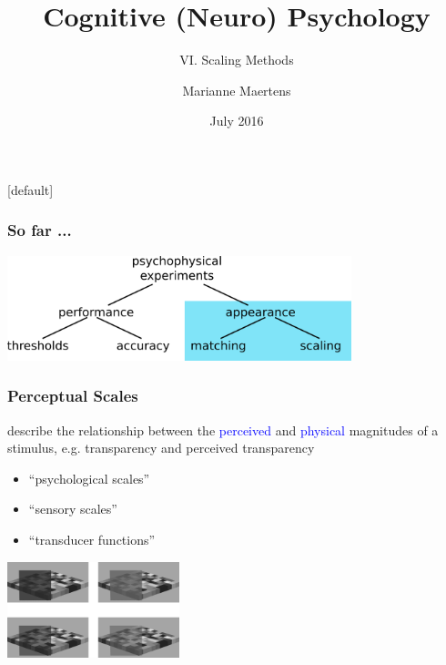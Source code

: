 \documentclass[]{beamer}
\title{ Cognitive (Neuro) Psychology }
\subtitle{VI. Scaling Methods}
\author{ Marianne Maertens }
\institute[TU Berlin]{Technische Universit\"at Berlin}
\date{July 2016}
\begin{document}
[default]

\frame{\titlepage}


\begin{frame}
 \frametitle{So far ...}
\begin{center}
\includegraphics[width=100mm]{figs/l4/methods_overview_appearance.png} 
\end{center}
\end{frame}


\begin{frame}
 \frametitle{Perceptual Scales}

describe the relationship between the \textcolor{blue}{perceived} and \textcolor{blue}{physical} magnitudes of a stimulus, e.g. transparency and perceived transparency

 \begin{itemize}
  \item[] ``psychological scales''
  \item[] ``sensory scales''
  \item[] ``transducer functions''
 \end{itemize}
\begin{center}
\includegraphics[width=50mm]{figs/l6/perceived_transparency.png}
\end{center}
\end{frame}
\end{document}
